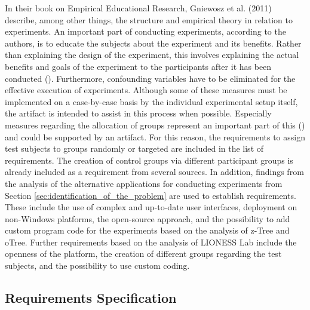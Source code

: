 In their book on Empirical Educational Research, Gniewosz et al. (2011) describe, among other things, the structure and empirical theory in relation to experiments. An important part of conducting experiments, according to the authors, is to educate the subjects about the experiment and its benefits. Rather than explaining the design of the experiment, this involves explaining the actual benefits and goals of the experiment to the participants after it has been conducted (\cite{Gniewosz.2011}). Furthermore, confounding variables have to be eliminated for the effective execution of experiments. Although some of these measures must be implemented on a case-by-case basis by the individual experimental setup itself, the artifact is intended to assist in this process when possible. Especially measures regarding the allocation of groups represent an important part of this (\cite{Gniewosz.2011}) and could be supported by an artifact. For this reason, the requirements to assign test subjects to groups randomly or targeted are included in the list of requirements. The creation of control groups via different participant groups is already included as a requirement from several sources. In addition, findings from the analysis of the alternative applications for conducting experiments from Section \ref{sec:identification_of_the_problem} are used to establish requirements. These include the use of complex and up-to-date user interfaces, deployment on non-Windows platforms, the open-source approach, and the possibility to add custom program code for the experiments based on the analysis of z-Tree and oTree. Further requirements based on the analysis of LIONESS Lab include the openness of the platform, the creation of different groups regarding the test subjects, and the possibility to use custom coding.

\subsection{Requirements Specification}\label{subsec:reqSpec}

